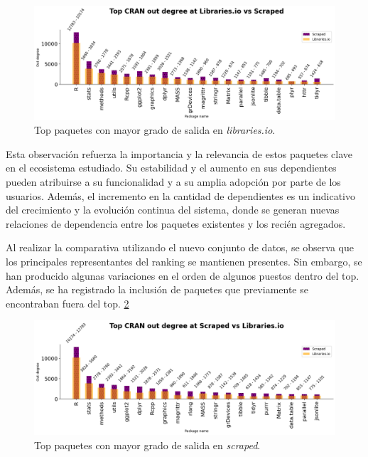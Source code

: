 \begin{figure}[ht!]
    \begin{center}
        \includegraphics[width=1\textwidth]{img/cran/out_lib.png}
        \caption{Top paquetes con mayor grado de salida en \textit{libraries.io}.}
        \label{fig:cran_out_libio_top}
    \end{center}
\end{figure}

Esta observación refuerza la importancia y la relevancia de estos paquetes clave en el
ecosistema estudiado. Su estabilidad y el aumento en sus dependientes pueden atribuirse a
su funcionalidad y a su amplia adopción por parte de los usuarios. Además, el incremento en
la cantidad de dependientes es un indicativo del crecimiento y la evolución continua del
sistema, donde se generan nuevas relaciones de dependencia entre los paquetes existentes
y los recién agregados.

Al realizar la comparativa utilizando el nuevo conjunto de datos, se observa que los principales
representantes del ranking se mantienen presentes. Sin embargo, se han producido algunas variaciones
en el orden de algunos puestos dentro del top. Además, se ha registrado la inclusión de paquetes que
previamente se encontraban fuera del top. \ref{fig:cran_out_scraped_top}

\begin{figure}[ht!]
    \begin{center}
        \includegraphics[width=1\textwidth]{img/cran/out_scr.png}
        \caption{Top paquetes con mayor grado de salida en \textit{scraped}.}
        \label{fig:cran_out_scraped_top}
    \end{center}
\end{figure}

